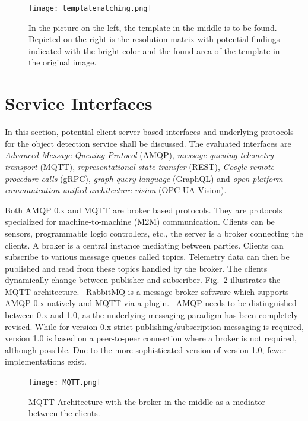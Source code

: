 \begin{figure}[ht]
	\centering
  \texttt{[image: templatematching.png]}
	\caption[Template Matching]{In the picture on the left, the template in the middle is to be found. Depicted on the right is the resolution matrix with potential findings indicated with the bright color and the found area of the template in the original image.~\cite{OpenCV-Documentation2014Template2018}}
	\label{templatematching}
\end{figure}

\section {Service Interfaces}
\label{serviceinterfaces}
In this section, potential client-server-based interfaces and underlying protocols for the object detection service shall be discussed. The evaluated interfaces are \textit{Advanced Message Queuing Protocol} (AMQP), \textit{message queuing telemetry transport} (MQTT), \textit{representational state transfer} (REST), \textit{Google remote procedure calls} (gRPC), \textit{graph query language} (GraphQL) and \textit{open platform communication unified architecture vision} (OPC UA Vision). 

Both AMQP 0.x and MQTT are broker based protocols. They are protocols specialized for machine-to-machine (M2M) communication. Clients can be sensors, programmable logic controllers, etc., the server is a broker connecting the clients. A broker is a central instance mediating between parties. Clients can subscribe to various message queues called topics. Telemetry data can then be published and read from these topics handled by the broker. The clients dynamically change between publisher and subscriber. Fig.~\ref{MQTT} illustrates the MQTT architecture.~\cite{Banks2014MQTT2018} RabbitMQ is a message broker software which supports AMQP 0.x natively and MQTT via a plugin.~\cite{RabittMQ-Documentation2018Which2018} AMQP needs to be distinguished between 0.x and 1.0, as the underlying messaging paradigm has been completely revised. While for version 0.x strict publishing/subscription messaging is required, version 1.0 is based on a peer-to-peer connection where a broker is not required, although possible. Due to the more sophisticated version of version 1.0, fewer implementations exist.~\cite{Dizdarevic2018SurveyIntegration}

\begin{figure}[ht]
	\centering
  \texttt{[image: MQTT.png]}
	\caption[MQTT Architecture]{MQTT Architecture with the broker in the middle as a mediator between the clients.~\cite{N.A.Pure-javascript-MQTT-broker.2018}}
	\label{MQTT}
\end{figure}

